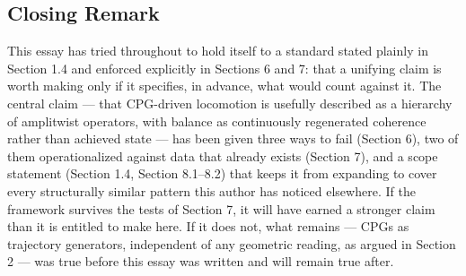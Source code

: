 \documentclass[12pt]{article}
\begin{document}
\subsection{Closing Remark}

This essay has tried throughout to hold itself to a standard stated plainly in Section 1.4 and enforced explicitly in Sections 6 and 7: that a unifying claim is worth making only if it specifies, in advance, what would count against it. The central claim — that CPG-driven locomotion is usefully described as a hierarchy of amplitwist operators, with balance as continuously regenerated coherence rather than achieved state — has been given three ways to fail (Section 6), two of them operationalized against data that already exists (Section 7), and a scope statement (Section 1.4, Section 8.1--8.2) that keeps it from expanding to cover every structurally similar pattern this author has noticed elsewhere. If the framework survives the tests of Section 7, it will have earned a stronger claim than it is entitled to make here. If it does not, what remains — CPGs as trajectory generators, independent of any geometric reading, as argued in Section 2 — was true before this essay was written and will remain true after.
\end{document}
